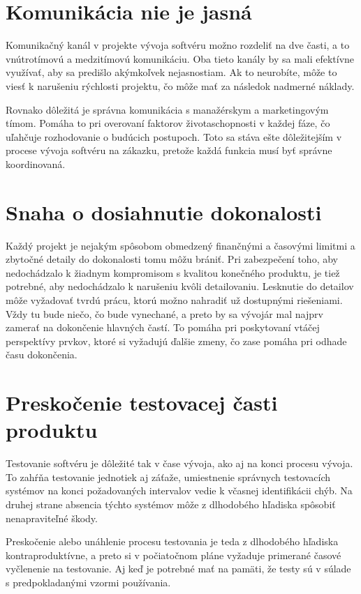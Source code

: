 \documentclass[10pt,twoside,slovak,a4paper]{article}
\begin{document}
\section{Komunikácia nie je jasná}
Komunikačný kanál v projekte vývoja softvéru možno rozdeliť na dve časti, a to vnútrotímovú a medzitímovú komunikáciu. Oba tieto kanály by sa mali efektívne využívať, aby sa predišlo akýmkoľvek nejasnostiam. Ak to neurobíte, môže to viesť k narušeniu rýchlosti projektu, čo môže mať za následok nadmerné náklady.

Rovnako dôležitá je správna komunikácia s manažérskym a marketingovým tímom. Pomáha to pri overovaní faktorov životaschopnosti v každej fáze, čo uľahčuje rozhodovanie o budúcich postupoch. Toto sa stáva ešte dôležitejším v procese vývoja softvéru na zákazku, pretože každá funkcia musí byť správne koordinovaná.


\section{Snaha o dosiahnutie dokonalosti}
Každý projekt je nejakým spôsobom obmedzený finančnými a časovými limitmi a zbytočné detaily do dokonalosti tomu môžu brániť. Pri zabezpečení toho, aby nedochádzalo k žiadnym kompromisom s kvalitou konečného produktu, je tiež potrebné, aby nedochádzalo k narušeniu kvôli detailovaniu. Lesknutie do detailov môže vyžadovať tvrdú prácu, ktorú možno nahradiť už dostupnými riešeniami. Vždy tu bude niečo, čo bude vynechané, a preto by sa vývojár mal najprv zamerať na dokončenie hlavných častí. To pomáha pri poskytovaní vtáčej perspektívy prvkov, ktoré si vyžadujú ďalšie zmeny, čo zase pomáha pri odhade času dokončenia.

\section{Preskočenie testovacej časti produktu}
Testovanie softvéru je dôležité tak v čase vývoja, ako aj na konci procesu vývoja. To zahŕňa testovanie jednotiek aj záťaže, umiestnenie správnych testovacích systémov na konci požadovaných intervalov vedie k včasnej identifikácii chýb. Na druhej strane absencia týchto systémov môže z dlhodobého hľadiska spôsobiť nenapraviteľné škody.

Preskočenie alebo unáhlenie procesu testovania je teda z dlhodobého hľadiska kontraproduktívne, a preto si v počiatočnom pláne vyžaduje primerané časové vyčlenenie na testovanie. Aj keď je potrebné mať na pamäti, že testy sú v súlade s predpokladanými vzormi používania.
\end{document}
